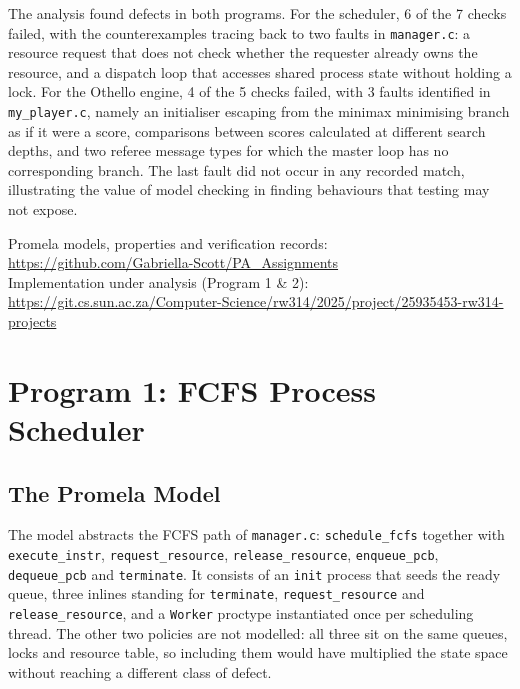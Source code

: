 \documentclass[10pt,a4paper]{article}
\newcommand{\code}[1]{\texttt{#1}}
\begin{document}
The analysis found defects in both programs. For the scheduler, 6 of the 
7 checks failed, with the counterexamples tracing back to two faults in 
\code{manager.c}: a resource request that does not check whether the requester 
already owns the resource, and a dispatch loop that accesses shared process 
state without holding a lock. For the Othello engine, 4 of the 5 checks 
failed, with 3 faults identified in \code{my\_player.c}, namely an initialiser 
escaping from the minimax minimising branch as if it were a score, comparisons 
between scores calculated at different search depths, and two referee message 
types for which the master loop has no corresponding branch. The last fault 
did not occur in any recorded match, illustrating the value of model checking 
in finding behaviours that testing may not expose.

\medskip
\noindent
Promela models, properties and verification records:
\url{https://github.com/Gabriella-Scott/PA_Assignments}\\
Implementation under analysis (Program 1 \& 2): 
\url{https://git.cs.sun.ac.za/Computer-Science/rw314/2025/project/25935453-rw314-projects}\\

\section{Program 1: FCFS Process Scheduler}

\subsection{The Promela Model}

The model abstracts the FCFS path of \code{manager.c}: \code{schedule\_fcfs}
together with \code{execute\_instr}, \code{request\_resource},
\code{release\_resource}, \code{enqueue\_pcb}, \code{dequeue\_pcb} and
\code{terminate}. It consists of an \code{init} process that seeds the ready
queue, three inlines standing for \code{terminate}, \code{request\_resource}
and \code{release\_resource}, and a \code{Worker} proctype instantiated once
per scheduling thread. The other two policies are not modelled: all three sit
on the same queues, locks and resource table, so including them would have
multiplied the state space without reaching a different class of defect.
\end{document}
